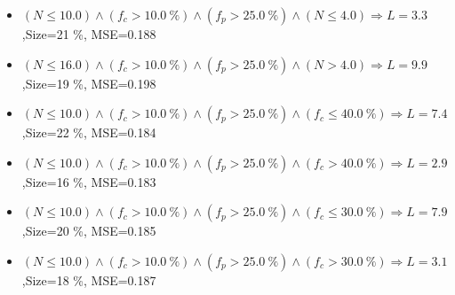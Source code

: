 \documentclass[numbered]{CSL}
\begin{document}
\begin{itemize}
\item $(N \leq 10.0) \land (f_c > 10.0~\%) \land (f_p > 25.0~\%) \land (N \leq 4.0) \Rightarrow L = 3.3$,\hfill Size=21 \%, MSE=0.188
\item $(N \leq 16.0) \land (f_c > 10.0~\%) \land (f_p > 25.0~\%) \land (N > 4.0) \Rightarrow L = 9.9$,\hfill Size=19 \%, MSE=0.198
\item $(N \leq 10.0) \land (f_c > 10.0~\%) \land (f_p > 25.0~\%) \land (f_c \leq 40.0~\%) \Rightarrow L = 7.4$,\hfill Size=22 \%, MSE=0.184
\item $(N \leq 10.0) \land (f_c > 10.0~\%) \land (f_p > 25.0~\%) \land (f_c > 40.0~\%) \Rightarrow L = 2.9$,\hfill Size=16 \%, MSE=0.183
\item $(N \leq 10.0) \land (f_c > 10.0~\%) \land (f_p > 25.0~\%) \land (f_c \leq 30.0~\%) \Rightarrow L = 7.9$,\hfill Size=20 \%, MSE=0.185
\item $(N \leq 10.0) \land (f_c > 10.0~\%) \land (f_p > 25.0~\%) \land (f_c > 30.0~\%) \Rightarrow L = 3.1$,\hfill Size=18 \%, MSE=0.187
\end{itemize}
\end{document}
